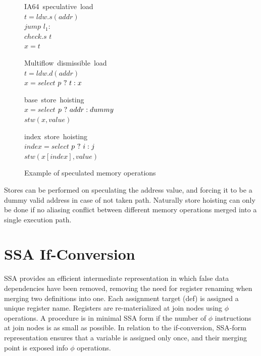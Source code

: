 \begin{figure}
\begin{minipage}[t]{4cm}
\mbox{IA64 speculative load} \\
$t = ldw.s(addr) $ \\
$jump$ $l_1:$ \\
$check.s$ $t$ \\
$x = t$ \\
\end{minipage}
\begin{minipage}[t]{4cm}
\mbox{Multiflow dismissible load} \\
$t = ldw.d(addr) $ \\
$x = select$ $p ~?~ t : x $ \\
\end{minipage}

\begin{minipage}[t]{4cm}
\mbox{base store hoisting} \\
$x=select$ $p ~?~ addr : dummy $ \\
$stw (x, value) $ \\
\end{minipage}
\begin{minipage}[t]{4cm}
\mbox{index store hoisting} \\
$index=select$ $p ~?~ i : j $ \\
$stw (x[index], value) $ \\
\end{minipage}
\label{fig:spec}
\caption{Example of speculated memory operations}
\end{figure}

Stores can be performed on speculating the address value, and forcing it to be a dummy valid address in case of not taken path. Naturally store hoisting can only be done if no aliasing conflict between different memory operations merged into a single execution path.

\section{SSA If-Conversion}

SSA provides an efficient intermediate representation in which false data dependencies have been removed, removing the need for register renaming when merging two definitions into one. Each assignment target (def) is assigned a unique register name. Registers are re-materialized at join nodes using $\phi$ operations. A procedure is in minimal SSA form if the number of $\phi$ instructions at join nodes is as small as possible. In relation to the if-conversion, SSA-form representation ensures that a variable is assigned only once, and their merging point is exposed info $\phi$ operations.


